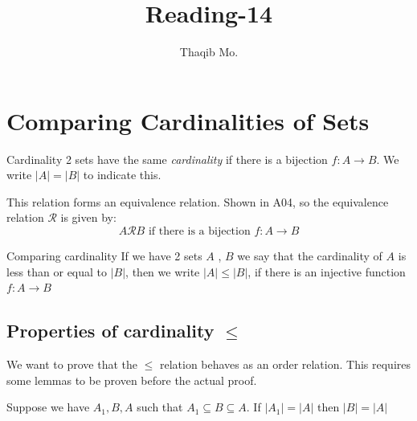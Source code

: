 \documentclass[16pt,a4paper]{article}
\author{Thaqib Mo.}
\title{ Reading-14 }
\theoremstyle{definition}
\begin{document}
\maketitle
\newpage
\section{Comparing Cardinalities of Sets}

\begin{defn}{Cardinality}{}
2 sets have the same \textit{cardinality} if there is a bijection $f:A\rightarrow B$. We write $|A| = |B|$ to indicate this. 
\end{defn}
This relation forms an equivalence relation. Shown in A04, so the equivalence relation $\mathcal{R}$ is given by:
\[A\mathcal{R}B \text{ if there is a bijection $f:A\rightarrow B$}\]


\begin{defn}{Comparing cardinality}{}
If we have 2 sets $A$ , $B$ we say that the cardinality of $A$ is less than or equal to $|B|$, then we write $|A|\leq |B|$, if there is an injective function $f:A\rightarrow B$
\end{defn}

\subsection{Properties of cardinality $\leq$}

We want to prove that the $\leq$ relation behaves as an order relation. This requires some lemmas to be proven before the actual proof. 

\begin{lemm}{}{}
Suppose we have $A_1, B, A$ such that $A_1 \subseteq B \subseteq A$. If $|A_1| = |A|$ then $|B| = |A|$
\end{lemm}{}{}
\end{document}
